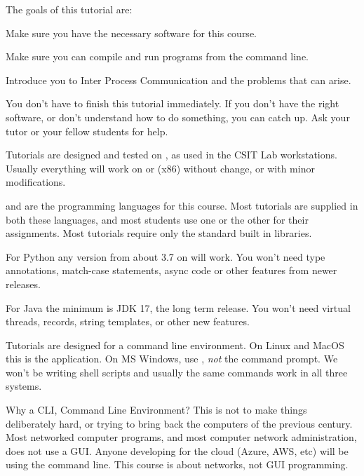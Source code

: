 










The goals of this tutorial are:

\DOT Make sure you have the necessary software for this course.

\DOT Make sure you can compile and run programs from the command line.

\DOT Introduce you to Inter Process Communication and the problems that can arise.

You don't have to finish this tutorial immediately. If you don't have the right
software, or don't understand how to do something, you can catch up. Ask your tutor
or your fellow students for help.



Tutorials are designed and tested on , as used in the CSIT Lab workstations.
Usually everything will work on  or  (x86) without change,
or with minor modifications.

 and  are the  programming languages for this course.
Most tutorials are supplied in both these languages, and most students use one or the
other for their assignments. Most tutorials require only the standard built in libraries.

For Python any version from about 3.7 on will work. You won't need type annotations,
match-case statements, async code or other features from newer releases.

For Java the minimum is JDK 17, the long term release. You won't need virtual threads,
records, string templates, or other new features.

Tutorials are designed for a command line environment. On Linux and MacOS this is the
 application. On MS Windows, use , \emph{not} the command
prompt. We won't be writing shell scripts and usually the same commands work in all
three systems.

Why a CLI, Command Line Environment? This is not to make things deliberately hard,
or trying to bring back the computers of the previous century. Most networked computer
programs, and most computer network administration, does not use a GUI. Anyone developing
for the cloud (Azure, AWS, etc) will be using the command line. This course is
about networks, not GUI programming.

